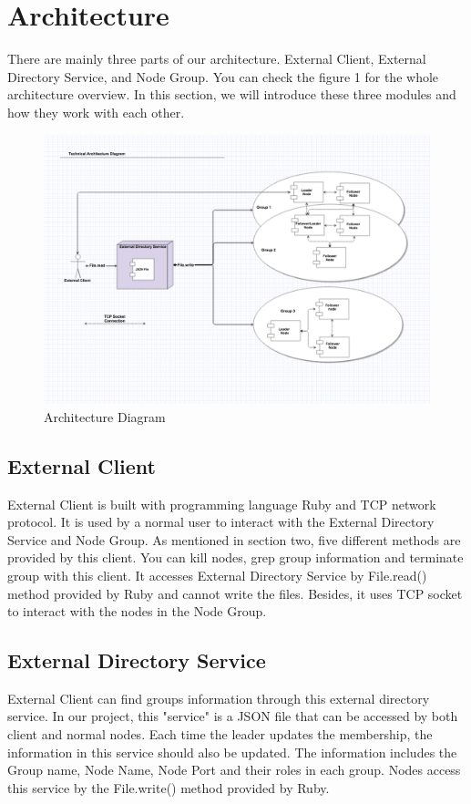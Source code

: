 \documentclass[a4paper,11pt]{article}
\begin{document}
\section{Architecture}
There are mainly three parts of our architecture. External Client, External Directory Service, and Node Group. You can check the figure 1 for the whole architecture overview. In this section, we will introduce these three modules and how they work with each other.

\begin{figure}
    \centering
    \includegraphics[scale=0.6]{assets/architectureDiagram}
    \caption{Architecture Diagram}
    \label{figure1: }
\end{figure}

\subsection{External Client}
External Client is built with programming language Ruby and TCP network protocol. It is used by a normal user to interact with the External Directory Service and Node Group. As mentioned in section two, five different methods are provided by this client. You can kill nodes, grep group information and terminate group with this client. It accesses External Directory Service by File.read() method provided by Ruby and cannot write the files. Besides, it uses TCP socket to interact with the nodes in the Node Group.
\subsection{External Directory Service}
External Client can find groups information through this external directory service. In our project, this "service" is a JSON file that can be accessed by both client and normal nodes. Each time the leader updates the membership, the information in this service should also be updated. The information includes the Group name, Node Name, Node Port and their roles in each group. Nodes access this service by the File.write() method provided by Ruby.
\end{document}
